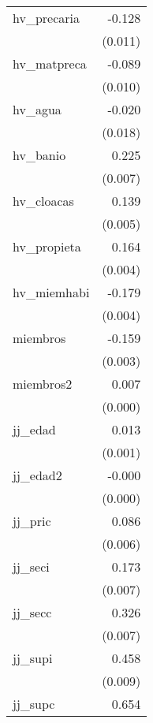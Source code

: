 {\begin{longtable}{l*{1}{D{.}{.}{-1}}}
\addlinespace
hv\_precaria &      -0.128\sym{***}\\
            &     (0.011)         \\
\addlinespace
hv\_matpreca &      -0.089\sym{***}\\
            &     (0.010)         \\
\addlinespace
hv\_agua     &      -0.020         \\
            &     (0.018)         \\
\addlinespace
hv\_banio    &       0.225\sym{***}\\
            &     (0.007)         \\
\addlinespace
hv\_cloacas  &       0.139\sym{***}\\
            &     (0.005)         \\
\addlinespace
hv\_propieta &       0.164\sym{***}\\
            &     (0.004)         \\
\addlinespace
hv\_miemhabi &      -0.179\sym{***}\\
            &     (0.004)         \\
\addlinespace
miembros    &      -0.159\sym{***}\\
            &     (0.003)         \\
\addlinespace
miembros2   &       0.007\sym{***}\\
            &     (0.000)         \\
\addlinespace
jj\_edad     &       0.013\sym{***}\\
            &     (0.001)         \\
\addlinespace
jj\_edad2    &      -0.000\sym{***}\\
            &     (0.000)         \\
\addlinespace
jj\_pric     &       0.086\sym{***}\\
            &     (0.006)         \\
\addlinespace
jj\_seci     &       0.173\sym{***}\\
            &     (0.007)         \\
\addlinespace
jj\_secc     &       0.326\sym{***}\\
            &     (0.007)         \\
\addlinespace
jj\_supi     &       0.458\sym{***}\\
            &     (0.009)         \\
\addlinespace
jj\_supc     &       0.654\sym{***}\\

\end{longtable}}
